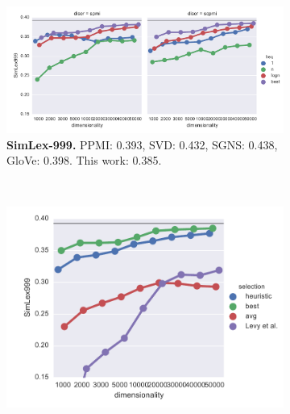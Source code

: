 \begin{figure}
  \centering
  \begin{subfigure}[t]{0.6\textwidth}
    \includegraphics[width=\textwidth]{supplement/figures/SimLex999-best}
    \caption{\scriptsize \textbf{SimLex-999.}
      PPMI: 0.393,
      SVD: 0.432,
      SGNS: 0.438,
      GloVe: 0.398.
      This work: 0.385.
    }
    \label{fig:best-simlex}
  \end{subfigure}
  ~
  \begin{subfigure}[t]{0.37\textwidth}
    \includegraphics[width=\textwidth]{supplement/figures/SimLex999-global-best}
    \caption{}
    \label{fig:global-best-simlex}
  \end{subfigure}


\end{figure}
